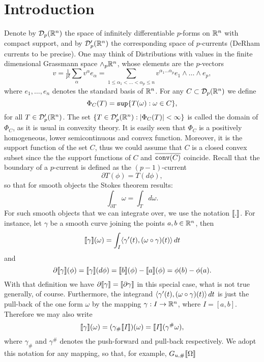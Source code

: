 \documentclass[11pt,a4paper]{article}
\begin{document}
\section{Introduction}
Denote by ${\cal D}_p(\mathbb{R}^n)$ the space of infinitely differentiable $p$-forms on $\mathbb{R}^n$ 
with compact support, and by
${\cal D}'_p(\mathbb{R}^n)$ the corresponding space of $p$-currents (DeRham currents to be precise). 
One may think of Distributions with values in the finite dimensional Grassmann space
$\wedge_p \mathbb{R}^n$, whose elements are the $p$-vectors
\[
   v = \tfrac{1}{p!}\sum_{\alpha} v^\alpha e_\alpha
     = \sum_{1\leq\alpha_1<\ldots<\alpha_p\leq n} v^{\alpha_1 \ldots \alpha_p} 
          e_1\wedge\ldots\wedge e_p,
\] 
where $e_1,\ldots,e_n$ denotes the standard basis of $\mathbb{R}^n$.
For any $C\subset {\cal D}_p(\mathbb{R}^n)$ we define
\begin{equation} \label{PhiC}
\Phi_{C}(T)={\tt sup}\{T(\omega): \omega\in C\},
\end{equation}
for all $T\in {\cal D}'_p(\mathbb{R}^n)$. The set $\{T\in{\cal D}'_p(\mathbb{R}^n): |\Phi_C(T)|<\infty \}$ is 
called the domain of $\Phi_C$, as it is usual in convexity theory. It is easily seen that
$\Phi_C$ is a positively homogeneous, lower semicontinuous and convex function. Moreover,
it is the support function of the set $C$, thus we could assume that $C$ is a 
closed convex subset since the the support functions of $C$ and $\overline{{\tt conv}(C)}$ coincide. Recall that the boundary of a $p$-current is defined as the $(p-1)$-current
\[
 \partial T(\phi) = T(d\phi),
\]
so that for smooth objects the Stokes theorem results:
\[
   \int_{\partial T} \omega = \int_T d\omega.
\]
For such smooth objects that we can integrate over, we use the notation $\llbracket.\rrbracket$. For
instance, let $\gamma$ be a smooth curve joining the points $a,b\in \mathbb{R}^n$, then
\[
   \llbracket\gamma\rrbracket(\omega)=\int_I \langle\gamma'(t),(\omega\circ\gamma)(t)\rangle \,dt
\]
and
\[
   \partial \llbracket\gamma\rrbracket(\phi)=\llbracket\gamma\rrbracket(d\phi)=\llbracket b\rrbracket(\phi)-\llbracket a\rrbracket(\phi)
   = \phi(b) - \phi(a).
\]
With that definition we have $ \partial \llbracket\gamma\rrbracket= \llbracket\partial \gamma\rrbracket$
in this special case, what
is not true generally, of course. Furthermore, the integrand $\langle\gamma'(t),(\omega\circ\gamma)(t)\rangle \,dt$ is just the pull-back of the one form $\omega$ by the mapping 
$\gamma:I \rightarrow \mathbb{R}^n$, where $I=[a,b]$. Therefore we may also write
\[
   \llbracket\gamma\rrbracket(\omega)=(\gamma_\#\llbracket I\rrbracket)(\omega)=\llbracket I\rrbracket(\gamma^{\#}\omega),
\]
where $\gamma_\#$ and $\gamma^{\#}$ denotes the push-forward and pull-back respectively.
We adopt this notation for any mapping, so that, for example, $G_{u,\#}\llbracket\Omega\rrbracket$
\end{document}
